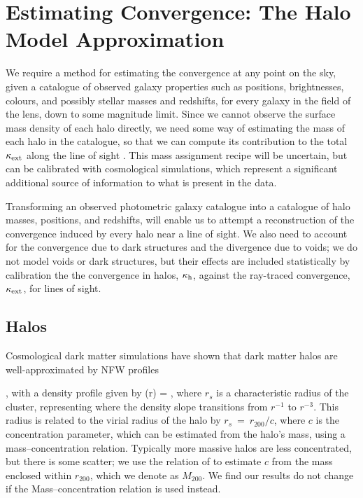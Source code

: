\documentclass[useAMS,usenatbib]{mn2e}
\begin{document}

\section{Estimating Convergence: The Halo Model Approximation}
\label{sec:model}

We require a method for estimating the
convergence at any point on the sky, given a catalogue of observed
galaxy properties such as positions, brightnesses, colours, and
possibly stellar masses and redshifts, for every galaxy in the field of
the lens, down to some magnitude limit. Since we cannot observe the
surface mass density of each halo directly, we need some way of
estimating the mass of each halo in the catalogue, so that we can compute
its contribution to the total $\kappa_{\rm ext}$ along the line of sight \citep[as
in \eg][]{GunnarssonEtal2006,WongEtal2011,KarpenkaEtal2012}. 
This mass assignment recipe
will be uncertain, but can be calibrated with cosmological simulations, which
represent a significant additional source of information to what is present in
the data.

Transforming an observed photometric galaxy catalogue into a 
catalogue of halo masses, positions, and redshifts, will enable us to
attempt a reconstruction of the convergence induced by every halo near a
line of sight. {We also need to account for the convergence due to dark structures and
the divergence due to voids; we do not model voids or dark structures, but their
effects are included statistically by calibration the the convergence in halos,
$\kappa_{\rm h}$, against the ray-traced convergence, $\kappa_{\rm ext}$, for \MS lines of sight.}



\subsection{Halos}
\label{sec:model:halos}

Cosmological dark matter simulations have shown that dark matter
halos are well-approximated by NFW profiles 


\citep{NFW}, with a density
profile given by
\be\label{eq:rhonfw}
\rho(r) = 
,
\ee
where $r_{s}$ is a characteristic radius of the cluster, representing where
the density slope transitions from $r^{-1}$ to $r^{-3}$. This radius is related
to the virial radius of the halo by $r_{s}~=~r_{200}/c$, where $c$ is the concentration parameter, which can be estimated from the halo's mass,
using a mass--concentration relation. Typically more massive halos are less concentrated,
but there is some scatter; we use the relation of \citet{Neto2007} to estimate $c$
from the mass enclosed within $r_{200}$, which we denote as $M_{200}$. We find our results do not change if the \citet{MaccioEtal2008} Mass--concentration relation is used instead. 
\end{document}
